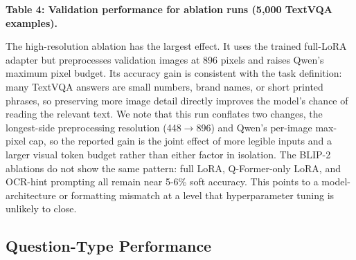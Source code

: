 \documentclass[11pt]{article}
\begin{document}
\begin{center}
\small
\textbf{Table 4: Validation performance for ablation runs (5,000 TextVQA examples).}\\[0.5em]
\end{center}

The high-resolution ablation has the largest effect. It uses the trained full-LoRA adapter but preprocesses validation images at 896 pixels and raises Qwen's maximum pixel budget. Its accuracy gain is consistent with the task definition: many TextVQA answers are small numbers, brand names, or short printed phrases, so preserving more image detail directly improves the model's chance of reading the relevant text. We note that this run conflates two changes, the longest-side preprocessing resolution (448$\to$896) and Qwen's per-image max-pixel cap, so the reported gain is the joint effect of more legible inputs and a larger visual token budget rather than either factor in isolation. The BLIP-2 ablations do not show the same pattern: full LoRA, Q-Former-only LoRA, and OCR-hint prompting all remain near 5-6\% soft accuracy. This points to a model-architecture or formatting mismatch at a level that hyperparameter tuning is unlikely to close.

\subsection{Question-Type Performance}
\end{document}
